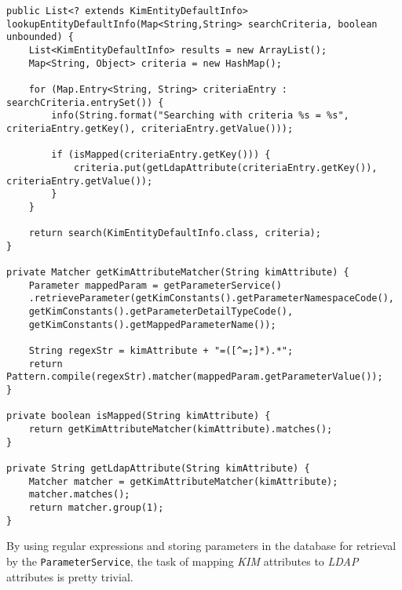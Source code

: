 \documentclass[12pt,notitlepage]{article}
\begin{document}
\begin{lstlisting}
public List<? extends KimEntityDefaultInfo> lookupEntityDefaultInfo(Map<String,String> searchCriteria, boolean unbounded) {
    List<KimEntityDefaultInfo> results = new ArrayList();
    Map<String, Object> criteria = new HashMap();
        
    for (Map.Entry<String, String> criteriaEntry : searchCriteria.entrySet()) {
        info(String.format("Searching with criteria %s = %s", criteriaEntry.getKey(), criteriaEntry.getValue()));
      
        if (isMapped(criteriaEntry.getKey())) {
            criteria.put(getLdapAttribute(criteriaEntry.getKey()), criteriaEntry.getValue());
        }
    }
        
    return search(KimEntityDefaultInfo.class, criteria);
}

private Matcher getKimAttributeMatcher(String kimAttribute) {
    Parameter mappedParam = getParameterService()
    .retrieveParameter(getKimConstants().getParameterNamespaceCode(),
    getKimConstants().getParameterDetailTypeCode(),
    getKimConstants().getMappedParameterName());

    String regexStr = kimAttribute + "=([^=;]*).*";
    return Pattern.compile(regexStr).matcher(mappedParam.getParameterValue());
}

private boolean isMapped(String kimAttribute) {
    return getKimAttributeMatcher(kimAttribute).matches();
}

private String getLdapAttribute(String kimAttribute) {
    Matcher matcher = getKimAttributeMatcher(kimAttribute);
    matcher.matches();
    return matcher.group(1);
}
\end{lstlisting}

By using regular expressions and storing parameters in the database for retrieval by the \verb|ParameterService|, the
task of mapping \emph{KIM} attributes to \emph{LDAP} attributes is pretty trivial.
\end{document}
